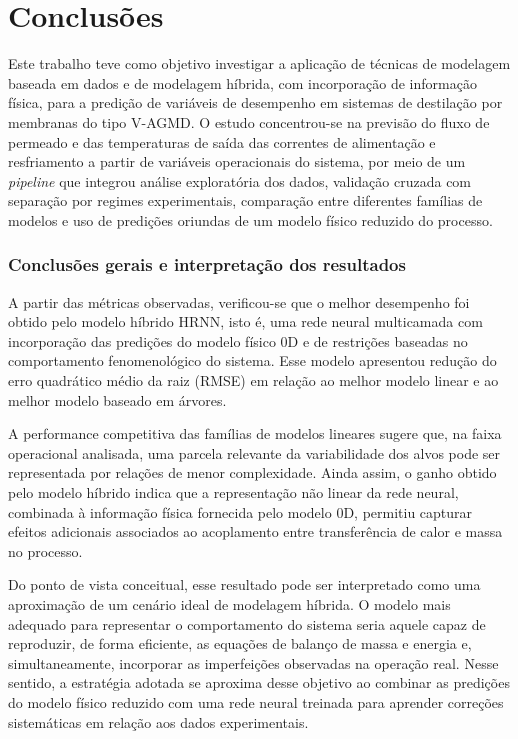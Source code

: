 \chapter{Conclusões}
\label{chap:conclusoes}

Este trabalho teve como objetivo investigar a aplicação de técnicas de modelagem baseada em dados e de modelagem híbrida, com incorporação de informação física, para a predição de variáveis de desempenho em sistemas de destilação por membranas do tipo V-AGMD. O estudo concentrou-se na previsão do fluxo de permeado e das temperaturas de saída das correntes de alimentação e resfriamento a partir de variáveis operacionais do sistema, por meio de um \textit{pipeline} que integrou análise exploratória dos dados, validação cruzada com separação por regimes experimentais, comparação entre diferentes famílias de modelos e uso de predições oriundas de um modelo físico reduzido do processo.

\subsection{Conclusões gerais e interpretação dos resultados}

A partir das métricas observadas, verificou-se que o melhor desempenho foi obtido pelo modelo híbrido HRNN, isto é, uma rede neural multicamada com incorporação das predições do modelo físico 0D e de restrições baseadas no comportamento fenomenológico do sistema. Esse modelo apresentou redução do erro quadrático médio da raiz (RMSE) em relação ao melhor modelo linear e ao melhor modelo baseado em árvores.

A performance competitiva das famílias de modelos lineares sugere que, na faixa operacional analisada, uma parcela relevante da variabilidade dos alvos pode ser representada por relações de menor complexidade. Ainda assim, o ganho obtido pelo modelo híbrido indica que a representação não linear da rede neural, combinada à informação física fornecida pelo modelo 0D, permitiu capturar efeitos adicionais associados ao acoplamento entre transferência de calor e massa no processo.

Do ponto de vista conceitual, esse resultado pode ser interpretado como uma aproximação de um cenário ideal de modelagem híbrida. O modelo mais adequado para representar o comportamento do sistema seria aquele capaz de reproduzir, de forma eficiente, as equações de balanço de massa e energia e, simultaneamente, incorporar as imperfeições observadas na operação real. Nesse sentido, a estratégia adotada se aproxima desse objetivo ao combinar as predições do modelo físico reduzido com uma rede neural treinada para aprender correções sistemáticas em relação aos dados experimentais.

